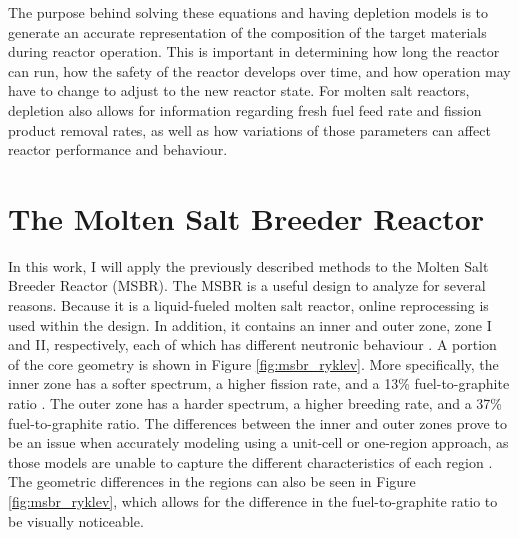 The purpose behind solving these equations and having depletion models is to generate an accurate representation of the composition of the target materials during reactor operation. This is important in determining how long the reactor can run, how the safety of the reactor develops over time, and how operation may have to change to adjust to the new reactor state. For molten salt reactors, depletion also allows for information regarding fresh fuel feed rate and fission product removal rates, as well as how variations of those parameters can affect reactor performance and behaviour.







\section{The Molten Salt Breeder Reactor}

In this work, I will apply the previously described methods to the Molten Salt Breeder Reactor (MSBR). The MSBR is a useful design to analyze for several reasons. Because it is a liquid-fueled molten salt reactor, online reprocessing is used within the design.
In addition, it contains an inner and outer zone, zone I and II, respectively, each of which has different neutronic behaviour \cite{robertson_conceptual_1971}.
A portion of the core geometry is shown in Figure \ref{fig:msbr_ryklev}.
More specifically, the inner zone has a softer spectrum, a higher fission rate, and a 13\% fuel-to-graphite ratio \cite{park_whole_2015}.
The outer zone has a harder spectrum, a higher breeding rate, and a 37\% fuel-to-graphite ratio.
The differences between the inner and outer zones prove to be an issue when accurately modeling using a unit-cell or one-region approach, as those models are unable to capture the different characteristics of each region \cite{rykhlevskii_modeling_2019}.
The geometric differences in the regions can also be seen in Figure \ref{fig:msbr_ryklev}, which allows for the difference in the fuel-to-graphite ratio to be visually noticeable.

